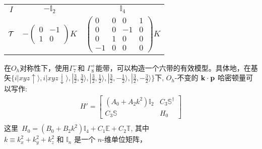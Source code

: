\begin{table*}[!htb]
{\begin{tabular}{ccc}
     $I$ & $-{\mathbb I_2}$&  ${\mathbb I_4}$\\
     $\cal{T}$     &    $-\left(\begin{array}{cc} 0 & -1 \\ 1 & 0 \end{array}\right)K $ & $ \left(\begin{array}{cccc}0 & 0 & 0 & 1 \\ 0 & 0 & -1 & 0 \\ 0 & 1 & 0 & 0 \\ -1 & 0 & 0 & 0\end{array}\right)K $ \\
    \hline
    \end{tabular}
    }
\end{table*}

在$O_h$对称性下，使用$\Gamma_7^-$和 $\Gamma_8^+$能带，可以构造一个六带的有效模型。具体地，在基矢$\{i|xyz\uparrow\rangle, i|xyz\downarrow\rangle, |\frac{3}{2}, \frac{3}{2}\rangle, |\frac{3}{2}, \frac{1}{2}\rangle, |\frac{3}{2}, -\frac{1}{2}\rangle, |\frac{3}{2}, -\frac{3}{2}\rangle\}$下, $O_h$-不变的 $\bold{k\cdot p}$ 哈密顿量可以写作:
%
%
\begin{equation}
    \begin{split}
        H'= \begin{bmatrix}
            \left(A_0+A_2k^2\right) {\mathbb I}_{2}& C_3{\mathbb S}^\dagger \\
            C_3{\mathbb S} & H_0
        \end{bmatrix}\\
\end{split}
\end{equation}
这里~$H_0=(B_0+B_2k^2){\mathbb I}_{4}+C_1 {\mathbb E}+C_2{\mathbb T}$, 其中~ $k\equiv k_x^2+k_y^2+k_z^2 \text{~和 ${\mathbb I}_n$ 是一个 $n$-维单位矩阵}$，

